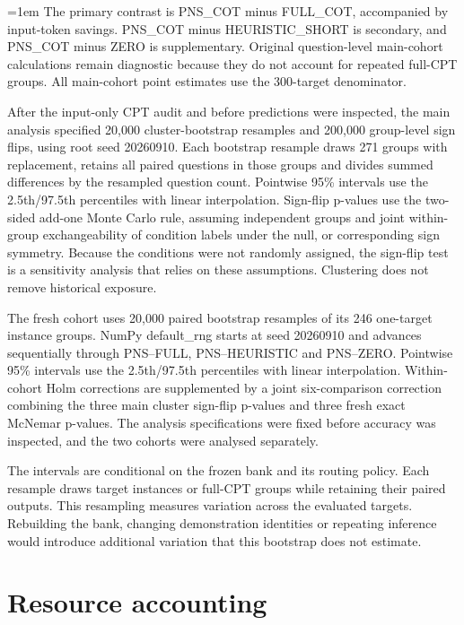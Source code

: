 \begingroup\emergencystretch=1em
The primary contrast is PNS\_\allowbreak{}COT minus FULL\_\allowbreak{}COT, accompanied by input-token savings. PNS\_\allowbreak{}COT minus HEURISTIC\_\allowbreak{}SHORT is secondary, and PNS\_\allowbreak{}COT minus ZERO is supplementary. Original question-level main-cohort calculations remain diagnostic because they do not account for repeated full-CPT groups. All main-cohort point estimates use the 300-target denominator.\par
\endgroup

After the input-only CPT audit and before predictions were inspected, the main analysis specified 20,000 cluster-bootstrap resamples \cite{Efron_1979} and 200,000 group-level sign flips, using root seed 20260910. Each bootstrap resample draws 271 groups with replacement, retains all paired questions in those groups and divides summed differences by the resampled question count. Pointwise 95\% intervals use the 2.5th/97.5th percentiles with linear interpolation. Sign-flip p-values use the two-sided add-one Monte Carlo rule, assuming independent groups and joint within-group exchangeability of condition labels under the null, or corresponding sign symmetry. Because the conditions were not randomly assigned, the sign-flip test is a sensitivity analysis that relies on these assumptions. Clustering does not remove historical exposure.

The fresh cohort uses 20,000 paired bootstrap resamples of its 246 one-target instance groups. NumPy default\_rng starts at seed 20260910 and advances sequentially through PNS--FULL, PNS--HEURISTIC and PNS--ZERO. Pointwise 95\% intervals use the 2.5th/97.5th percentiles with linear interpolation. Within-cohort Holm corrections are supplemented by a joint six-comparison correction combining the three main cluster sign-flip p-values and three fresh exact McNemar p-values. The analysis specifications were fixed before accuracy was inspected, and the two cohorts were analysed separately.

The intervals are conditional on the frozen bank and its routing policy. Each resample draws target instances or full-CPT groups while retaining their paired outputs. This resampling measures variation across the evaluated targets. Rebuilding the bank, changing demonstration identities or repeating inference would introduce additional variation that this bootstrap does not estimate.

\section{Resource accounting}\label{sec:4.5}

